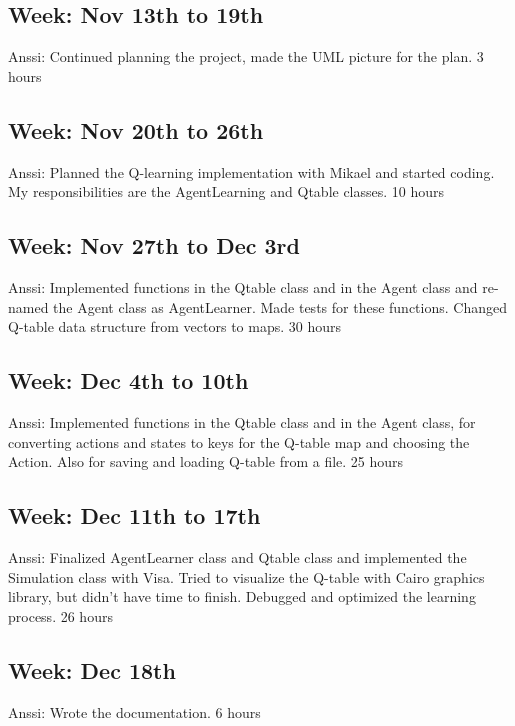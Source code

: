 \documentclass{article}
\begin{document}
\subsection{Week: Nov 13th to 19th}

Anssi:
Continued planning the project, made the UML picture for the plan.
3 hours

\subsection{Week: Nov 20th to 26th}

Anssi:
Planned the Q-learning implementation with Mikael and started coding.
My responsibilities are the AgentLearning and Qtable classes.
10 hours

\subsection{Week: Nov 27th to Dec 3rd}

Anssi:
Implemented functions in the Qtable class and in the Agent class and
re-named the Agent class as AgentLearner. Made tests for these functions.
Changed Q-table data structure from vectors to maps.
30 hours

\subsection{Week: Dec 4th to 10th}

Anssi:
Implemented functions in the Qtable class and in the Agent class, for
converting actions and states to keys for the Q-table map and choosing
the Action. Also for saving and loading Q-table from a file.
25 hours

\subsection{Week: Dec 11th to 17th}

Anssi:
Finalized AgentLearner class and Qtable class and implemented the
Simulation class with Visa. Tried to visualize the Q-table with
Cairo graphics library, but didn’t have time to finish. Debugged
and optimized  the learning process.
26 hours

\subsection{Week: Dec 18th}

Anssi:
Wrote the documentation.
6 hours
\end{document}
